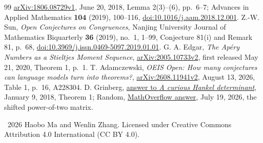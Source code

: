 \documentclass[11pt]{article}
\begin{document}
\begin{thebibliography}{99}
\href{https://arxiv.org/abs/1806.08729v1}{arXiv:1806.08729v1}, June 20, 2018,
Lemma 2(3)--(6), pp.~6--7; Advances in Applied Mathematics
\textbf{104} (2019), 100--116,
\href{https://doi.org/10.1016/j.aam.2018.12.001}{doi:10.1016/j.aam.2018.12.001}.
 Z.-W. Sun,
\emph{Open Conjectures on Congruences}, Nanjing University Journal of
Mathematics Biquarterly \textbf{36} (2019), no.~1, 1--99,
Conjecture 81(i) and Remark 81, p.~68,
\href{https://doi.org/10.3969/j.issn.0469-5097.2019.01.01}{doi:10.3969/j.issn.0469-5097.2019.01.01}.
 G. A. Edgar,
\emph{The Ap\'ery Numbers as a Stieltjes Moment Sequence},
\href{https://arxiv.org/abs/2005.10733v2}{arXiv:2005.10733v2},
first released May 21, 2020, Theorem 1, p.~1.
 T. Adamczewski,
\emph{OEIS Open: How many conjectures can language models turn into theorems?},
\href{https://arxiv.org/abs/2608.11941v2}{arXiv:2608.11941v2},
August 13, 2026, Table 1, p.~16, A228304.
 D. Grinberg,
\href{https://math.stackexchange.com/a/2597700}{answer to \emph{A curious Hankel determinant}},
January 9, 2018, Theorem 1;
Random, \href{https://mathoverflow.net/a/513374}{MathOverflow answer},
July 19, 2026, the shifted power-of-two matrix.
\end{thebibliography}
\bigskip
\noindent\small\textcopyright\ 2026 Haobo Ma and Wenlin Zhang.
Licensed under Creative Commons Attribution 4.0 International (CC BY 4.0).
\end{document}
